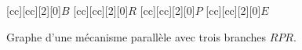 \begin{figure}[t]
\centering
{}[cc][cc][2][0]{$B$}
[cc][cc][2][0]{$R$}
[cc][cc][2][0]{$P$}
[cc][cc][2][0]{$E$}
\caption{\label{fig:chap1:graphe_mauvais}Graphe d'une mécanisme parallèle avec trois branches $RPR$.}
\end{figure}
